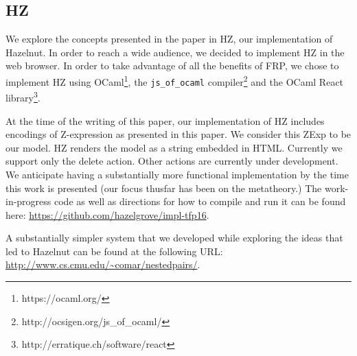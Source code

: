\subsection{HZ}
We explore the concepts presented in the paper in HZ, our implementation of Hazelnut.
In order to reach a wide audience, we decided to implement HZ in the web browser.
In order to take advantage of all the benefits of FRP, we chose to implement HZ using OCaml\footnote{https://ocaml.org/}, the \texttt{js\_of\_ocaml} compiler\footnote{http://ocsigen.org/js\_of\_ocaml/} and the OCaml React library\footnote{http://erratique.ch/software/react}.

At the time of the writing of this paper, our implementation of HZ includes encodings of Z-expression as presented in this paper.
We consider this ZExp to be our model. 
HZ renders the model as a string embedded in HTML.
Currently we support only the delete action.  Other actions are currently under development. We anticipate having a substantially more functional implementation by the time this work is presented (our focus thusfar has been on the metatheory.) 
The work-in-progress code as well as directions for how to compile and run it can be found here: \url{https://github.com/hazelgrove/impl-tfp16}.

A substantially simpler system that we developed while exploring the ideas that led to Hazelnut can be found at the following URL:
\url{http://www.cs.cmu.edu/~comar/nestedpairs/}.
